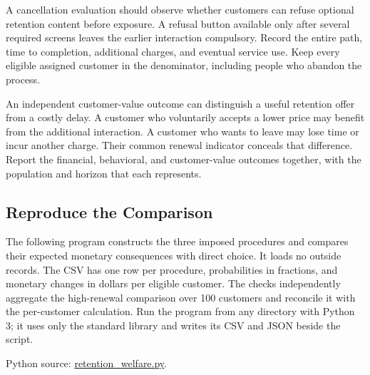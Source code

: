 \noindent \noindent A cancellation evaluation should observe whether customers can
refuse optional retention content before exposure. A refusal button
available only after several required screens leaves the earlier
interaction compulsory. Record the entire path, time to completion,
additional charges, and eventual service use. Keep every eligible
assigned customer in the denominator, including people who abandon the
process.

An independent customer-value outcome can distinguish a useful retention
offer from a costly delay. A customer who voluntarily accepts a lower
price may benefit from the additional interaction. A customer who wants
to leave may lose time or incur another charge. Their common renewal
indicator conceals that difference. Report the financial, behavioral,
and customer-value outcomes together, with the population and horizon
that each represents.

\hypertarget{M08-reproduce-the-comparison}{%
\subsection{Reproduce the
Comparison}\label{M08-reproduce-the-comparison}}

\noindent \noindent The following program constructs the three imposed procedures
and compares their expected monetary consequences with direct choice. It
loads no outside records. The CSV has one row per procedure,
probabilities in fractions, and monetary changes in dollars per eligible
customer. The checks independently aggregate the high-renewal comparison
over 100 customers and reconcile it with the per-customer calculation.
Run the program from any directory with Python 3; it uses only the
standard library and writes its CSV and JSON beside the script.

\FloatBarrier
{}
Python source:
\href{../03_Data_and_Code/Lecture_Examples/retention_welfare.py}{retention\_welfare.py}.

